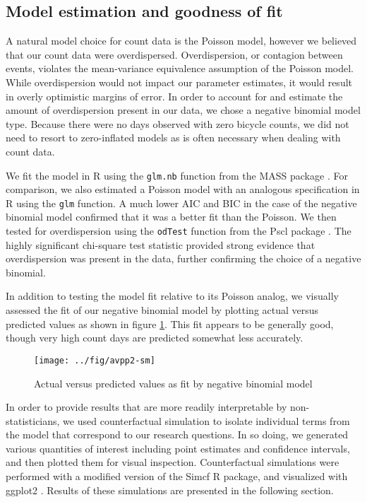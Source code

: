 \documentclass[12pt,letterpaper,article,twocolumn]{memoir}
\begin{document}
\subsection*{Model estimation and goodness of fit}
A natural model choice for count data is the Poisson model, however we
believed that our count data were overdispersed. Overdispersion, or
contagion between events, violates the mean-variance equivalence
assumption of the Poisson model. While overdispersion would not impact
our parameter estimates, it would result in overly optimistic margins
of error. In order to account for and estimate the amount of
overdispersion present in our data, we chose a negative binomial model
type. Because there were no days observed with zero bicycle counts, we
did not need to resort to zero-inflated models as is often necessary
when dealing with count data.

We fit the model in R using the \texttt{glm.nb} function from the MASS
package \parencite{Venables:2002aa}. For comparison, we also estimated a
Poisson model with an analogous specification in R using the
\texttt{glm} function. A much lower AIC and BIC in the case of the
negative binomial model confirmed that it was a better fit than the
Poisson. We then tested for overdispersion using the \texttt{odTest} function
from the Pscl package \parencite{Jackman:2014aa}. The highly significant
chi-square test statistic provided strong evidence that overdispersion
was present in the data, further confirming the choice of a negative
binomial.

In addition to testing the model fit relative to its Poisson
analog, we visually assessed the fit of our negative binomial model by
plotting actual versus predicted values as shown in figure
\ref{fg:avp}. This fit appears to be generally good, though very high
count days are predicted somewhat less accurately.

\begin{figure}[h!]
  \centering
  \texttt{[image: ../fig/avpp2-sm]}
  \caption{Actual versus predicted values as fit by negative binomial model}
  \label{fg:avp}
\end{figure}

In order to provide results that are more readily interpretable by
non-statisticians, we used counterfactual simulation to isolate
individual terms from the model that correspond to our research
questions. In so doing, we generated various quantities of interest
including point estimates and confidence intervals, and then plotted
them for visual inspection. Counterfactual simulations were performed
with a modified version of the Simcf R package, and visualized with
ggplot2 \parencite{Adolph:2014aa,Schmiedeskamp:aa,Wickham:2009aa}.
Results of these simulations are presented in the following section.
\end{document}

